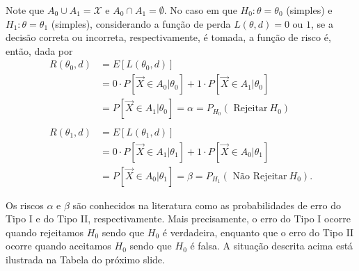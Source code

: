 \documentclass[12pt]{beamer}
\begin{document}
\begin{frame}{}
\begin{block}{}
\justifying
Note que \(A_0 \cup A_1 = \mathcal{X}\) e \(A_0 \cap A_1 = \emptyset\). No caso em que \(H_0 : \theta = \theta_0\) (simples) e \(H_1 : \theta = \theta_1\) (simples), considerando a função de perda \(L(\theta, d) = 0\) ou \(1\), se a decisão correta ou incorreta, respectivamente, é tomada, a função de risco é, então, dada por
\begin{align*}
R(\theta_0, d) &= E[L(\theta_0, d)] \\
&= 0 \cdot P[\vec{X} \in A_0|\theta_0] + 1 \cdot P[\vec{X} \in A_1|\theta_0] \\
&= P[\vec{X} \in A_1|\theta_0] = \alpha = P_{H_{0}}(\text{ Rejeitar}~ H_0) \\
\\
R(\theta_1, d) &= E[L(\theta_1, d)] \\
&= 0 \cdot P[\vec{X} \in A_1|\theta_1] + 1 \cdot P[\vec{X} \in A_0|\theta_1] \\
&= P[\vec{X} \in A_0|\theta_1] = \beta = P_{H_{1}}(\text{ Não Rejeitar}~ H_0).
\end{align*}
\end{block}
\end{frame}

\begin{frame}{}
\begin{block}{}
\justifying
Os riscos \(\alpha\) e \(\beta\) são conhecidos na literatura como as probabilidades de erro do Tipo I e do Tipo II, respectivamente. Mais precisamente, o erro do Tipo I ocorre quando rejeitamos \(H_0\) sendo que \(H_0\) é verdadeira, enquanto que o erro do Tipo II ocorre quando aceitamos \(H_0\) sendo que \(H_0\) é falsa. A situação descrita acima está ilustrada na Tabela do próximo slide.
\end{block}
\end{frame}
\end{document}
